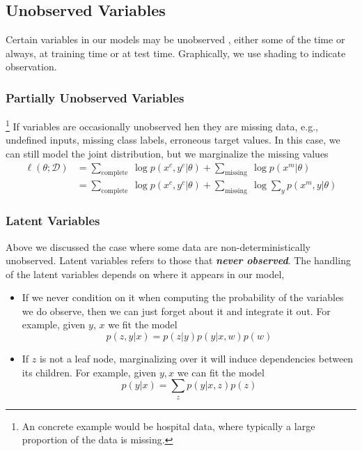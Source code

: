 \documentclass[11pt]{article}
\begin{document}
\subsection{Unobserved Variables}
Certain variables in our models may be unobserved , either some of the time or always, at training time or at test time. Graphically, we use shading to indicate observation.
\subsubsection{Partially Unobserved Variables}\footnote{An concrete example would be hospital data, where typically a large proportion of the data is missing. }
If variables are occasionally unobserved hen they are missing data, e.g., undefined inputs, missing class labels, erroneous target values. In this case, we can still model the joint distribution, but we marginalize the missing values
\begin{align*}
    \ell(\theta ; \mathcal{D})&=\sum_{\text {complete }} \log p\left(x^{c}, y^{c} | \theta\right)+\sum_{\text {missing }} \log p\left(x^{m} | \theta\right) \\
    &=\sum_{\text {complete }} \log p\left(x^{c}, y^{c} | \theta\right)+\sum_{\text {missing }} \log \sum_{y} p\left(x^{m}, y | \theta\right)
\end{align*}

\subsubsection{Latent Variables}
Above we discussed the case where some data are non-deterministically unobserved. Latent variables refers to those that \textit{\textbf{never observed}}. The handling of the latent variables depends on where it appears in our model,
\begin{itemize}
    \item If we never condition on it when computing the probability of the variables we do observe, then we can just forget about it and integrate it out. For example, given $y$, $x$ we fit the model
        \begin{equation*}
            p(z, y | x)=p(z | y) p(y | x, w) p(w)
        \end{equation*}
    \item If $z$ is not a leaf node, marginalizing over it will induce dependencies between its children. For example, given $y, x$ we can fit the model 
        \begin{equation*}
            p(y | x)=\sum_{z} p(y | x, z) p(z)
        \end{equation*}
\end{itemize}
\end{document}
